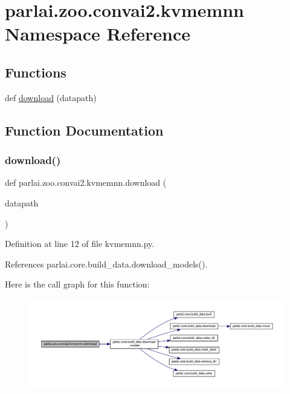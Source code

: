 \hypertarget{namespaceparlai_1_1zoo_1_1convai2_1_1kvmemnn}{}\section{parlai.\+zoo.\+convai2.\+kvmemnn Namespace Reference}
\label{namespaceparlai_1_1zoo_1_1convai2_1_1kvmemnn}
\subsection*{Functions}
\begin{DoxyCompactItemize}
\item 
def \hyperlink{namespaceparlai_1_1zoo_1_1convai2_1_1kvmemnn_a984032582e81c6a3d609f8a72dfb616e}{download} (datapath)
\end{DoxyCompactItemize}


\subsection{Function Documentation}
\mbox{\label{namespaceparlai_1_1zoo_1_1convai2_1_1kvmemnn_a984032582e81c6a3d609f8a72dfb616e}} 
\subsubsection{\texorpdfstring{download()}{download()}}
{\footnotesize\ttfamily def parlai.\+zoo.\+convai2.\+kvmemnn.\+download (\begin{DoxyParamCaption}\item[{}]{datapath }\end{DoxyParamCaption})}



Definition at line 12 of file kvmemnn.\+py.



References parlai.\+core.\+build\+\_\+data.\+download\+\_\+models().

Here is the call graph for this function\+:
\nopagebreak
\begin{figure}[H]
\begin{center}
\leavevmode
\includegraphics[width=350pt]{namespaceparlai_1_1zoo_1_1convai2_1_1kvmemnn_a984032582e81c6a3d609f8a72dfb616e_cgraph}
\end{center}
\end{figure}
